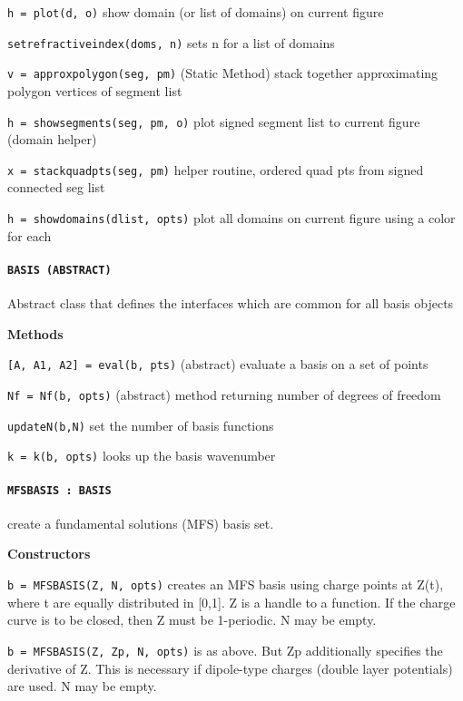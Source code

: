 {\tt h = plot(d, o)} show domain (or list of domains) on current figure

{\tt setrefractiveindex(doms, n)} sets n for a list of domains

{\tt v = approxpolygon(seg, pm)} (Static Method) stack together
approximating polygon vertices of segment list

{\tt h = showsegments(seg, pm, o)} plot signed segment list to
current figure (domain helper)

{\tt x = stackquadpts(seg, pm)} helper routine, ordered quad pts
from signed connected seg list 

{\tt h = showdomains(dlist, opts)} plot all domains on current
figure using a color for each

\newpage

\paragraph{\tt BASIS (ABSTRACT)} Abstract class that defines the
interfaces which are common for all basis objects


\textbf{Methods}

{\tt [A, A1, A2] = eval(b, pts)} (abstract) evaluate a basis on a set of points

{\tt Nf = Nf(b, opts)} (abstract) method returning number of degrees of freedom

{\tt updateN(b,N)} set the number of basis functions

{\tt k = k(b, opts)} looks up the basis wavenumber





\newpage 

\paragraph{\tt MFSBASIS : BASIS} create a fundamental solutions (MFS) basis
set.

\textbf{Constructors}

{\tt b = MFSBASIS(Z, N, opts)} creates an MFS basis using charge points
    at Z(t), where t are equally distributed in [0,1]. Z is a handle
   to a function. If the charge curve is to be closed, then Z must be
   1-periodic. N may be empty.

{\tt b = MFSBASIS({Z, Zp}, N, opts)} is as above. But Zp additionally specifies
   the derivative of Z. This is necessary if dipole-type charges (double
   layer potentials) are used. N may be empty.

